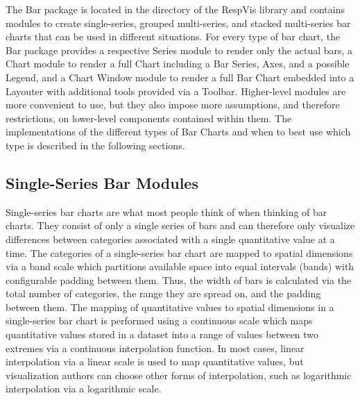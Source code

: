The Bar package is located in the  directory of the
RespVis library and contains modules to create single-series,
grouped multi-series, and stacked multi-series bar charts that can be
used in different situations. For every type of bar chart, the Bar
package provides a respective Series module to render only the
actual bars, a Chart module to render a full Chart including a Bar Series,
Axes, and a possible Legend, and a Chart Window module to render a
full Bar Chart embedded into a Layouter with additional tools provided via
a Toolbar. Higher-level modules are more convenient to use, but
they also impose more assumptions, and therefore restrictions, on
lower-level components contained within them. The implementations of
the different types of Bar Charts and when to best use which type is
described in the following sections.





\subsection{Single-Series Bar Modules}

Single-series bar charts are what most people think of when thinking
of bar charts. They consist of only a single series of bars and can
therefore only visualize differences between categories associated
with a single quantitative value at a time. The categories of a
single-series bar chart are mapped to spatial dimensions via a band
scale which partitions available space into equal intervals (bands)
with configurable padding between them. Thus, the width of bars is
calculated via the total number of categories, the range they are
spread on, and the padding between them. The mapping of quantitative
values to spatial dimensions in a single-series bar chart is performed
using a continuous scale which maps quantitative values stored in a
dataset into a range of values between two extremes via a continuous
interpolation function. In most cases, linear interpolation via a
linear scale is used to map quantitative values, but visualization
authors can choose other forms of interpolation, such as logarithmic
interpolation via a logarithmic scale.

